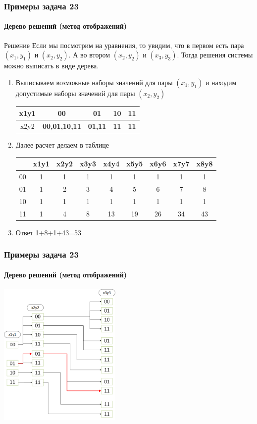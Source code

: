 \begin{frame}[t]
\frametitle{Примеры задача 23}
\framesubtitle{Дерево решений  (метод отображений)}

\begin{block}{Решение}
Если мы посмотрим на уравнения, то увидим, что в первом есть пара $(x_1,y_1)$ и $(x_2,y_2)$. А во втором
$(x_2,y_2)$ и $(x_3,y_3)$. Тогда решения системы можно выписать в виде дерева.

\begin{enumerate}
	\item Выписываем возможные наборы значений для пары $(x_1,y_1)$ и находим допустимые наборы значений для пары $(x_2,y_2)$ \\ 	\pause 
\begin{tabular}{|c|c|c|c|c|}
\hline 
x1y1 & 00 & 01 & 10 & 11\tabularnewline
\hline 
\hline 
x2y2 & \textbf{00,01,10,11} & \textbf{01,11} & \textbf{11} & \textbf{11}\tabularnewline
\hline 
\end{tabular} 	\pause 
\item Далее расчет делаем в таблице\\
\begin{tabular}{|c|c|c|c|c|c|c|c|c|}
\hline 
 & x1y1 & x2y2 & x3y3 & x4y4 & x5y5 & x6y6 & x7y7 & x8y8\tabularnewline
\hline 
00 & 1 & 1 & 1 & 1 & 1 & 1 & 1 & 1\tabularnewline
\hline 
01 & 1 & 2 & 3 & 4 & 5 & 6 & 7 & 8\tabularnewline
\hline 
10 & 1 & 1 & 1 & 1 & 1 & 1 & 1 & 1\tabularnewline
\hline 
11 & 1 & 4 & 8 & 13 & 19 & 26 & 34 & 43\tabularnewline
\hline 
\end{tabular} 	\pause 
\item Ответ 1+8+1+43=53
\end{enumerate}




\end{block}
	
\end{frame}

\begin{frame}[t]
\frametitle{Примеры задача 23}
\framesubtitle{Дерево решений  (метод отображений)}

\includegraphics[height=7cm]{images/t23_1}\\
	
\end{frame}




